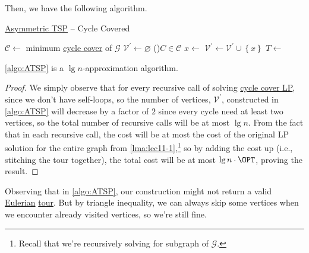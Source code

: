 Then, we have the following algorithm.

\begin{algorithm}[H]\label{algo:ATSP}
	\DontPrintSemicolon
	\caption{\hyperref[prb:ATSP]{Asymmetric TSP} -- Cycle Covered}
	\BlankLine
	\(\mathcal{C}\gets\) minimum \hyperref[subsec:cycle-covering-LP]{cycle cover} of \(\mathcal{G}\)\;
	\(\mathcal{V} ^\prime \gets \varnothing \)\;
	\For(){\(C\in \mathcal{C} \)}{
		\(x\gets\)
		\(\mathcal{V} ^\prime \gets \mathcal{V} ^\prime \cup \left\{ x \right\}\)\;
	}
	\(T\gets\)
	\;
	\;
\end{algorithm}

\begin{theorem}
	\autoref{algo:ATSP} is a \(\lg n\)-approximation algorithm.
\end{theorem}
\begin{proof}
	We simply observe that for every recursive call of solving \hyperref[subsec:cycle-covering-LP]{cycle cover LP}, since we don't have self-loops, so the number of vertices, \(\mathcal{V} ^\prime \), constructed in \autoref{algo:ATSP} will decrease by a factor of \(2\) since every cycle need at least two vertices, so the total number of recursive calls will be at most \(\lg n\). From the fact that in each recursive call, the cost will be at most the cost of the original LP solution for the entire graph from \autoref{lma:lec11-1},\footnote{Recall that we're recursively solving for subgraph of \(\mathcal{G} \).} so by adding the cost up (i.e., stitching the tour together), the total cost will be at most \(\lg n\cdot \OPT\), proving the result.
\end{proof}

\begin{remark}[Repetition]
	Observing that in \autoref{algo:ATSP}, our construction might not return a valid  \href{https://en.wikipedia.org/wiki/Eulerian_path}{Eulerian} \hyperref[def:tour]{tour}. But by triangle inequality, we can always skip some vertices when we encounter already visited vertices, so we're still fine.
\end{remark}

